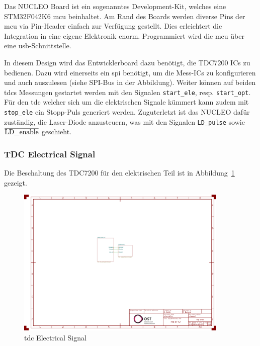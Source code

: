 \documentclass[11pt,a4paper,hidelinks]{article}
\begin{document}
Das NUCLEO Board ist ein sogenanntes \dq Development-Kit\dq, welches eine STM32F042K6 \acrshort{mcu}
beinhaltet. Am Rand des Boards werden diverse Pins der \acrfull{mcu} via Pin-Header
einfach zur Verfügung gestellt. Dies erleichtert die Integration in eine eigene Elektronik
enorm. Programmiert wird die \acrshort{mcu} über eine \acrshort{usb}-Schnittstelle.

In diesem Design wird das Entwicklerboard dazu benötigt, die TDC7200 ICs zu
bedienen. Dazu wird einerseits ein \acrfull{spi} benötigt, um die Mess-ICs zu konfigurieren
und auch auszulesen (siehe SPI-Bus in der Abbildung). Weiter können auf beiden \acrshort{tdc}s Messungen
gestartet werden mit den Signalen \lstinline|start_ele|, resp. \lstinline|start_opt|. Für den
\acrshort{tdc} welcher sich um die elektrischen Signale kümmert kann zudem mit \lstinline|stop_ele| ein
Stopp-Puls generiert werden.
Zuguterletzt ist das NUCLEO dafür zuständig, die Laser-Diode anzusteuern, was mit den Signalen
\lstinline|LD_pulse| sowie $\overline{\mbox{\lstinline|LD_enable|}}$ geschieht.

\subsubsection{TDC Electrical Signal}

Die Beschaltung des TDC7200 \cite{ti2016tdc7200_datasheet} für den elektrischen Teil ist in
Abbildung~\ref{fig:tdc_ele_signal} gezeigt.

\begin{figure}[H]
    \centering
    \includegraphics[page=2, trim=80 330 750 310, clip, width=0.9\textwidth]{attachments/schematic.pdf}
    \caption{\acrshort{tdc} Electrical Signal}\label{fig:tdc_ele_signal}
\end{figure}
\end{document}

